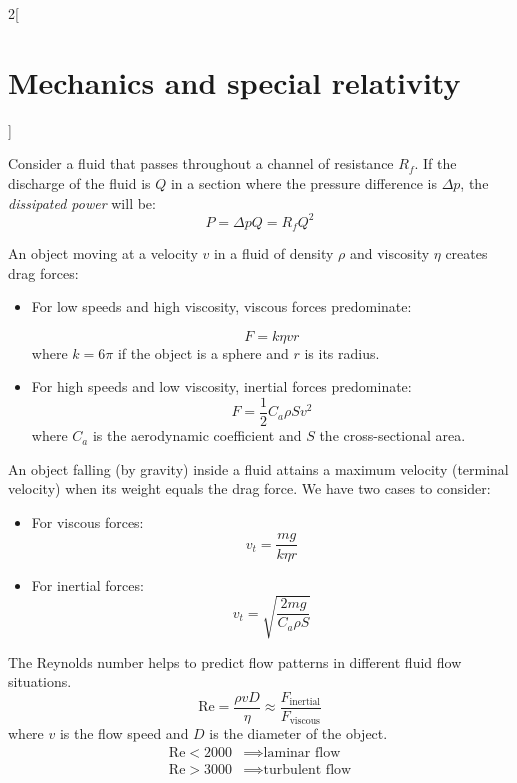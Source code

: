 \documentclass[../../../main_physics.tex]{subfiles}
\begin{document}
\begin{multicols}{2}[\section{Mechanics and special relativity}]
\begin{proposition}
    Consider a fluid that passes throughout a channel of resistance $R_f$. If the discharge of the fluid is $Q$ in a section where the pressure difference is $\Delta p$, the \emph{dissipated power} will be:
    $$P=\Delta pQ=R_fQ^2$$
  \end{proposition}
  \begin{proposition}
    An object moving at a velocity $v$ in a fluid of density $\rho$ and viscosity $\eta$ creates drag forces:
    \begin{itemize}
      \item For low speeds and high viscosity, viscous forces predominate:\par
            $$F=k\eta vr$$
            where $k=6\pi$ if the object is a sphere and $r$ is its radius.
      \item For high speeds and low viscosity, inertial forces predominate:
            $$F=\frac{1}{2}C_a\rho Sv^2$$
            where $C_a$ is the aerodynamic coefficient and $S$ the cross-sectional area.
    \end{itemize}
  \end{proposition}
  \begin{proposition}
    An object falling (by gravity) inside a fluid attains a maximum velocity (terminal velocity) when its weight equals the drag force. We have two cases to consider:
    \begin{itemize}
      \item For viscous forces: $$v_t=\frac{mg}{k\eta r}$$
      \item For inertial forces: $$v_t=\sqrt{\frac{2mg}{C_a\rho S}}$$
    \end{itemize}
  \end{proposition}
  \begin{proposition}
    The Reynolds number helps to predict flow patterns in different fluid flow situations.
    $$\text{Re}=\frac{\rho vD}{\eta}\approx\frac{F_{\text{inertial}}}{F_{\text{viscous}}}$$
    where $v$ is the flow speed and $D$ is the diameter of the object.
    \begin{align*}
      \text{Re}<2000 & \implies\text{laminar flow}   \\
      \text{Re}>3000 & \implies\text{turbulent flow}
    \end{align*}
  \end{proposition}


\end{multicols}
\end{document}
